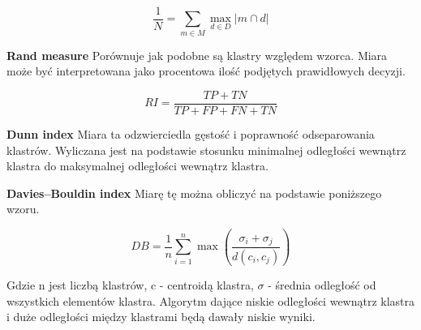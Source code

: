 \documentclass[12pt,a4paper]{article}
\begin{document}
$$ \frac{1}{N} = \sum_{m \in M} \max_{d \in D} | m \cap d |   $$

\textbf{Rand measure}
Porównuje jak podobne są klastry względem wzorca. Miara może być interpretowana jako procentowa ilość podjętych prawidłowych decyzji.

$$ RI = \frac{TP + TN}{TP + FP + FN + TN}$$

\textbf{Dunn index}
Miara ta odzwierciedla gęstość i poprawność odseparowania klastrów. Wyliczana jest na podstawie stosunku minimalnej odległości wewnątrz klastra do maksymalnej odległości wewnątrz klastra.

\textbf{Davies–Bouldin index}
Miarę tę można obliczyć na podstawie poniższego wzoru.

$$ DB = \frac{1}{n} \sum_{i=1}^{n} \max{(\frac{\sigma _{i} + \sigma _{j}}{d(c_i, c_j)})}   $$

Gdzie n jest liczbą klastrów, c - centroidą klastra, $ \sigma $ - średnia odległość od wszystkich elementów klastra. Algorytm dające niskie odległości wewnątrz klastra i duże odległości między klastrami będą dawały niskie wyniki.
\end{document}
